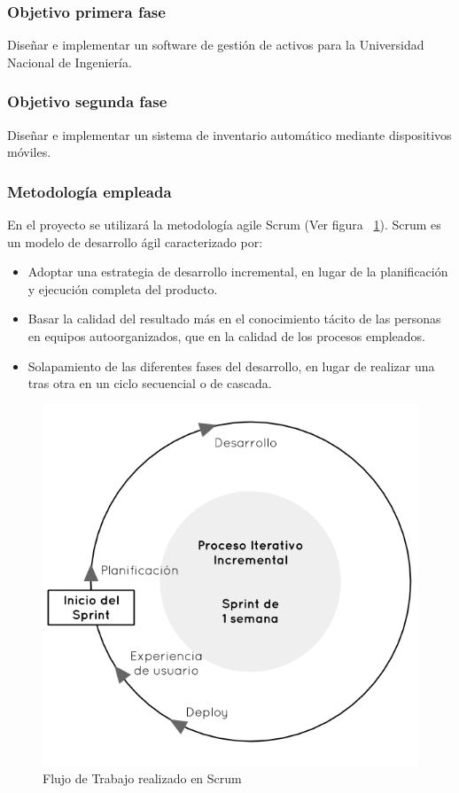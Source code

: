 \subsubsection{Objetivo primera fase}
Diseñar e implementar un software de gestión de activos para la Universidad Nacional de Ingeniería.

\subsubsection{Objetivo segunda fase}
Diseñar e implementar un sistema de inventario automático mediante dispositivos móviles.

\subsubsection{Metodología empleada}
En el proyecto se utilizará la metodología agile Scrum (Ver figura ~\ref{fig:scrum}). Scrum es un modelo de desarrollo ágil caracterizado por:

\begin{itemize}
  \item Adoptar una estrategia de desarrollo incremental, en lugar de la planificación y ejecución completa del producto.
  \item Basar la calidad del resultado más en el conocimiento tácito de las personas en equipos autoorganizados, que en la calidad de los procesos empleados.
  \item Solapamiento de las diferentes fases del desarrollo, en lugar de realizar una tras otra en un ciclo secuencial o de cascada.
\end{itemize}

\begin{figure}[h!]
  \centering
  \includegraphics[scale=0.6]{images/activities/camila/scrum.png}
  \caption{Flujo de Trabajo realizado en Scrum}
  \label{fig:scrum}
\end{figure}

